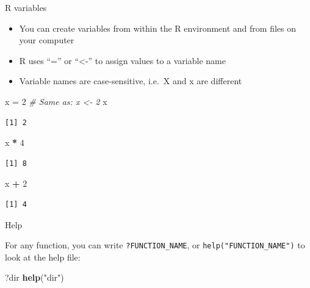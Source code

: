\documentclass[
  ignorenonframetext,
]{beamer}
\newenvironment{Shaded}{\begin{snugshade}}{\end{snugshade}}
\newcommand{\CommentTok}[1]{\textcolor[rgb]{0.56,0.35,0.01}{\textit{#1}}}
\newcommand{\DecValTok}[1]{\textcolor[rgb]{0.00,0.00,0.81}{#1}}
\newcommand{\KeywordTok}[1]{\textcolor[rgb]{0.13,0.29,0.53}{\textbf{#1}}}
\newcommand{\NormalTok}[1]{#1}
\newcommand{\OperatorTok}[1]{\textcolor[rgb]{0.81,0.36,0.00}{\textbf{#1}}}
\newcommand{\StringTok}[1]{\textcolor[rgb]{0.31,0.60,0.02}{#1}}
\providecommand{\tightlist}{%
  \setlength{\itemsep}{0pt}\setlength{\parskip}{0pt}}
\begin{document}
\begin{frame}[fragile]{R variables}
\protect\hypertarget{r-variables}{}

\begin{itemize}
\tightlist
\item
  You can create variables from within the R environment and from files
  on your computer
\item
  R uses ``='' or ``\textless-'' to assign values to a variable name
\item
  Variable names are case-sensitive, i.e.~X and x are different
\end{itemize}

\begin{Shaded}
\begin{Highlighting}[]
\NormalTok{x =}\StringTok{ }\DecValTok{2} \CommentTok{# Same as: x <- 2}
\NormalTok{x}
\end{Highlighting}
\end{Shaded}

\begin{verbatim}
[1] 2
\end{verbatim}

\begin{Shaded}
\begin{Highlighting}[]
\NormalTok{x }\OperatorTok{*}\StringTok{ }\DecValTok{4}
\end{Highlighting}
\end{Shaded}

\begin{verbatim}
[1] 8
\end{verbatim}

\begin{Shaded}
\begin{Highlighting}[]
\NormalTok{x }\OperatorTok{+}\StringTok{ }\DecValTok{2}
\end{Highlighting}
\end{Shaded}

\begin{verbatim}
[1] 4
\end{verbatim}

\end{frame}

\begin{frame}[fragile]{Help}
\protect\hypertarget{help}{}

For any function, you can write \texttt{?FUNCTION\_NAME}, or
\texttt{help("FUNCTION\_NAME")} to look at the help file:

\begin{Shaded}
\begin{Highlighting}[]
\NormalTok{?dir}
\KeywordTok{help}\NormalTok{(}\StringTok{"dir"}\NormalTok{)}
\end{Highlighting}
\end{Shaded}

\end{frame}
\end{document}
